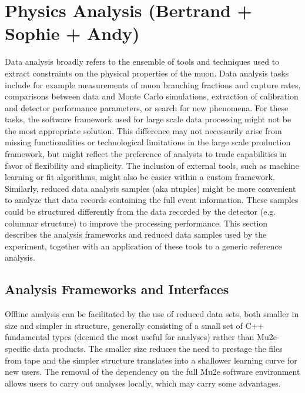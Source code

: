 \section{Physics Analysis (Bertrand + Sophie + Andy)}
\label{sec:analysis}

Data analysis broadly refers to the ensemble of tools and techniques used to extract constraints on the physical properties of the muon. Data analysis tasks include for example measurements of muon branching fractions and capture rates, comparisons between data and Monte Carlo simulations, extraction of calibration and detector performance parameters, or search for new phenomena. For these tasks, the software framework used for large scale data processing might not be the most appropriate solution. This difference may not necessarily arise from missing functionalities or technological limitations in the large scale production framework, but might reflect the preference of analysts to trade capabilities in favor of flexibility and simplicity. The inclusion of external tools, such as machine learning or fit algorithms, might also be easier within a custom framework. Similarly, reduced data analysis samples (aka ntuples) might be more convenient to analyze that data records containing the full event information. These samples could be structured differently from the data recorded by the detector (e.g. columnar structure) to improve the processing performance. This section describes the analysis frameworks and reduced data samples used by the experiment, together with an application of these tools to a generic reference analysis.  


\subsection{Analysis Frameworks and Interfaces}

Offline analysis can be facilitated by the use of reduced data sets, both smaller in size and simpler in structure, generally consisting of a small set of C++ fundamental types (deemed the most useful for analyses) rather than Mu2e-specific data products. The smaller size reduces the need to prestage the files from tape and the simpler structure translates into a shallower learning curve for new users. The removal of the dependency on the full Mu2e software environment allows users to carry out analyses locally, which may carry some advantages. 


